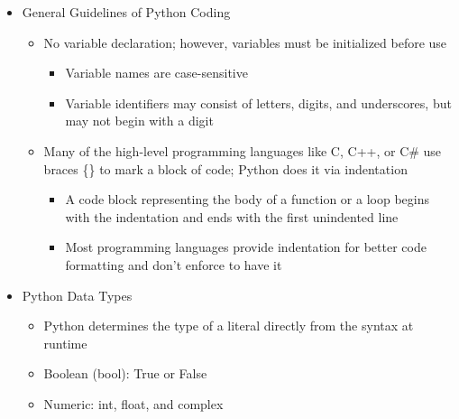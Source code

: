 \begin{itemize}

  \item General Guidelines of Python Coding

    \begin{itemize}

      \item No variable declaration; however, variables must be initialized before use

        \begin{itemize}

          \item Variable names are case-sensitive

          \item Variable identifiers may consist of letters, digits, and underscores, but may not begin with a digit

        \end{itemize}

      \item Many of the high-level programming languages like C, C++, or C# use braces \{\} to mark a block of code; Python does it via indentation

        \begin{itemize}

          \item A code block representing the body of a function or a loop begins with the indentation and ends with the first unindented line

          \item Most programming languages provide indentation for better code formatting and don't enforce to have it

        \end{itemize}

    \end{itemize}

  \item Python Data Types

    \begin{itemize}

      \item Python determines the type of a literal directly from the syntax at runtime

      \item Boolean (bool): True or False

      \item Numeric: int, float, and complex


\end{itemize}
\end{itemize}
